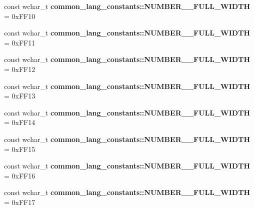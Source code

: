 \begin{DoxyCompactItemize}
\item 
\hypertarget{group___indexing_gacd909bf295b3cef9d8969116a1e155f7}{const wchar\-\_\-t {\bfseries common\-\_\-lang\-\_\-constants\-::\-N\-U\-M\-B\-E\-R\-\_\-\_\-\-F\-U\-L\-L\-\_\-\-W\-I\-D\-T\-H} = 0x\-F\-F10}\label{group___indexing_gacd909bf295b3cef9d8969116a1e155f7}

\item 
\hypertarget{group___indexing_gaaafcb45e11eab5249cef711774c09d40}{const wchar\-\_\-t {\bfseries common\-\_\-lang\-\_\-constants\-::\-N\-U\-M\-B\-E\-R\-\_\-\_\-\-F\-U\-L\-L\-\_\-\-W\-I\-D\-T\-H} = 0x\-F\-F11}\label{group___indexing_gaaafcb45e11eab5249cef711774c09d40}

\item 
\hypertarget{group___indexing_ga67980236de0dc25e0b184ff74bcb3221}{const wchar\-\_\-t {\bfseries common\-\_\-lang\-\_\-constants\-::\-N\-U\-M\-B\-E\-R\-\_\-\_\-\-F\-U\-L\-L\-\_\-\-W\-I\-D\-T\-H} = 0x\-F\-F12}\label{group___indexing_ga67980236de0dc25e0b184ff74bcb3221}

\item 
\hypertarget{group___indexing_gab683af4f3453a99ceea045541f0142c2}{const wchar\-\_\-t {\bfseries common\-\_\-lang\-\_\-constants\-::\-N\-U\-M\-B\-E\-R\-\_\-\_\-\-F\-U\-L\-L\-\_\-\-W\-I\-D\-T\-H} = 0x\-F\-F13}\label{group___indexing_gab683af4f3453a99ceea045541f0142c2}

\item 
\hypertarget{group___indexing_ga5308f3df9de908740d874f6428626b7f}{const wchar\-\_\-t {\bfseries common\-\_\-lang\-\_\-constants\-::\-N\-U\-M\-B\-E\-R\-\_\-\_\-\-F\-U\-L\-L\-\_\-\-W\-I\-D\-T\-H} = 0x\-F\-F14}\label{group___indexing_ga5308f3df9de908740d874f6428626b7f}

\item 
\hypertarget{group___indexing_ga30b24050c7edb74b9ac078f44425540d}{const wchar\-\_\-t {\bfseries common\-\_\-lang\-\_\-constants\-::\-N\-U\-M\-B\-E\-R\-\_\-\_\-\-F\-U\-L\-L\-\_\-\-W\-I\-D\-T\-H} = 0x\-F\-F15}\label{group___indexing_ga30b24050c7edb74b9ac078f44425540d}

\item 
\hypertarget{group___indexing_gaa4c7c78e2d2bbb069416ecdbf25bdbf2}{const wchar\-\_\-t {\bfseries common\-\_\-lang\-\_\-constants\-::\-N\-U\-M\-B\-E\-R\-\_\-\_\-\-F\-U\-L\-L\-\_\-\-W\-I\-D\-T\-H} = 0x\-F\-F16}\label{group___indexing_gaa4c7c78e2d2bbb069416ecdbf25bdbf2}

\item 
\hypertarget{group___indexing_ga702921929efbbf5e2cbd900adc30d263}{const wchar\-\_\-t {\bfseries common\-\_\-lang\-\_\-constants\-::\-N\-U\-M\-B\-E\-R\-\_\-\_\-\-F\-U\-L\-L\-\_\-\-W\-I\-D\-T\-H} = 0x\-F\-F17}\label{group___indexing_ga702921929efbbf5e2cbd900adc30d263}


\end{DoxyCompactItemize}
